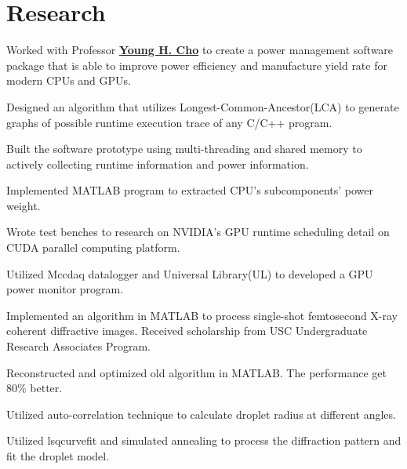 \documentclass[]{deedy-resume-openfont}
\begin{document}
\begin{minipage}[t]{0.64\textwidth}
\section{Research}
Worked with Professor \textbf{\href{http://oasys.isi.edu/profile.php?id=1}{Young H. Cho}} to create a power management software package that is able to improve power efficiency and manufacture yield rate for modern CPUs and GPUs.
\begin{tightemize}
	\item Designed an algorithm that utilizes Longest-Common-Ancestor(LCA) to generate graphs of possible runtime execution trace of any C/C++ program.
	\item Built the software prototype using multi-threading and shared memory to actively collecting runtime information and power information.
	\item Implemented MATLAB program to extracted CPU's subcomponents' power weight.
	\item Wrote test benches to research on NVIDIA's GPU runtime scheduling detail on CUDA parallel computing platform.
	\item Utilized Mccdaq datalogger and Universal Library(UL) to developed a GPU power monitor program.
\end{tightemize}
\sectionsep

Implemented an algorithm in MATLAB to process single-shot femtosecond X-ray coherent diffractive images. Received scholarship from USC Undergraduate Research Associates Program.
\begin{tightemize}
	\item Reconstructed and optimized old algorithm in MATLAB. The performance get 80\% better.
	\item Utilized auto-correlation technique to calculate droplet radius at different angles.
	\item Utilized lsqcurvefit and simulated annealing to process the diffraction pattern and fit the droplet model.
\end{tightemize}
\sectionsep





\end{minipage} 
\end{document}
